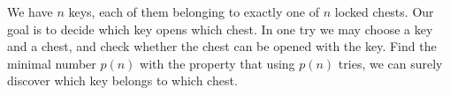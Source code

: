 We have $n$ keys, each of them belonging to exactly one of $n$ locked chests. Our goal is to decide which key opens which chest. In one try we may choose a key and a chest, and check whether the chest can be opened with the key. Find the minimal number $p(n)$ with the property that using $p(n)$ tries, we can surely discover which key belongs to which chest.